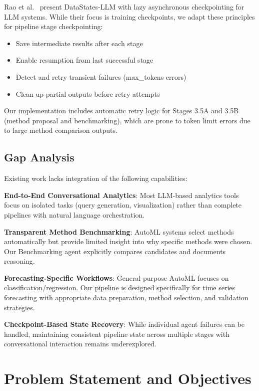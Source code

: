 \documentclass[11pt,a4paper]{article}
\begin{document}
Rao et al.~\cite{datastates} present DataStates-LLM with lazy asynchronous checkpointing for LLM systems. While their focus is training checkpoints, we adapt these principles for pipeline stage checkpointing:

\begin{itemize}
    \item Save intermediate results after each stage
    \item Enable resumption from last successful stage
    \item Detect and retry transient failures (max\_tokens errors)
    \item Clean up partial outputs before retry attempts
\end{itemize}

Our implementation includes automatic retry logic for Stages 3.5A and 3.5B (method proposal and benchmarking), which are prone to token limit errors due to large method comparison outputs.

\subsection{Gap Analysis}

Existing work lacks integration of the following capabilities:

\textbf{End-to-End Conversational Analytics}: Most LLM-based analytics tools focus on isolated tasks (query generation, visualization) rather than complete pipelines with natural language orchestration.

\textbf{Transparent Method Benchmarking}: AutoML systems select methods automatically but provide limited insight into why specific methods were chosen. Our Benchmarking agent explicitly compares candidates and documents reasoning.

\textbf{Forecasting-Specific Workflows}: General-purpose AutoML focuses on classification/regression. Our pipeline is designed specifically for time series forecasting with appropriate data preparation, method selection, and validation strategies.

\textbf{Checkpoint-Based State Recovery}: While individual agent failures can be handled, maintaining consistent pipeline state across multiple stages with conversational interaction remains underexplored.

\section{Problem Statement and Objectives}
\end{document}
